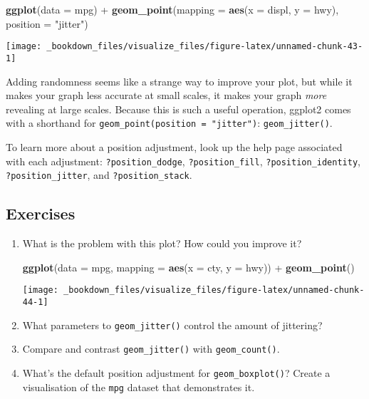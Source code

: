 \documentclass[]{book}
\newenvironment{Shaded}{\begin{snugshade}}{\end{snugshade}}
\newcommand{\KeywordTok}[1]{\textcolor[rgb]{0.13,0.29,0.53}{\textbf{{#1}}}}
\newcommand{\DataTypeTok}[1]{\textcolor[rgb]{0.13,0.29,0.53}{{#1}}}
\newcommand{\StringTok}[1]{\textcolor[rgb]{0.31,0.60,0.02}{{#1}}}
\newcommand{\NormalTok}[1]{{#1}}
\begin{document}
\begin{Shaded}
\begin{Highlighting}[]
\KeywordTok{ggplot}\NormalTok{(}\DataTypeTok{data =} \NormalTok{mpg) +}\StringTok{ }
\StringTok{  }\KeywordTok{geom_point}\NormalTok{(}\DataTypeTok{mapping =} \KeywordTok{aes}\NormalTok{(}\DataTypeTok{x =} \NormalTok{displ, }\DataTypeTok{y =} \NormalTok{hwy), }\DataTypeTok{position =} \StringTok{"jitter"}\NormalTok{)}
\end{Highlighting}
\end{Shaded}

\begin{center}\texttt{[image: \_bookdown\_files/visualize\_files/figure-latex/unnamed-chunk-43-1]} \end{center}

Adding randomness seems like a strange way to improve your plot, but
while it makes your graph less accurate at small scales, it makes your
graph \emph{more} revealing at large scales. Because this is such a
useful operation, ggplot2 comes with a shorthand for
\texttt{geom\_point(position\ =\ "jitter")}: \texttt{geom\_jitter()}.

To learn more about a position adjustment, look up the help page
associated with each adjustment: \texttt{?position\_dodge},
\texttt{?position\_fill}, \texttt{?position\_identity},
\texttt{?position\_jitter}, and \texttt{?position\_stack}.

\subsection{Exercises}\label{exercises-5}

\begin{enumerate}
\def\labelenumi{\arabic{enumi}.}
\item
  What is the problem with this plot? How could you improve it?

\begin{Shaded}
\begin{Highlighting}[]
\KeywordTok{ggplot}\NormalTok{(}\DataTypeTok{data =} \NormalTok{mpg, }\DataTypeTok{mapping =} \KeywordTok{aes}\NormalTok{(}\DataTypeTok{x =} \NormalTok{cty, }\DataTypeTok{y =} \NormalTok{hwy)) +}\StringTok{ }
\StringTok{  }\KeywordTok{geom_point}\NormalTok{()}
\end{Highlighting}
\end{Shaded}

  \begin{center}\texttt{[image: \_bookdown\_files/visualize\_files/figure-latex/unnamed-chunk-44-1]} \end{center}
\item
  What parameters to \texttt{geom\_jitter()} control the amount of
  jittering?
\item
  Compare and contrast \texttt{geom\_jitter()} with
  \texttt{geom\_count()}.
\item
  What's the default position adjustment for \texttt{geom\_boxplot()}?
  Create a visualisation of the \texttt{mpg} dataset that demonstrates
  it.
\end{enumerate}
\end{document}
